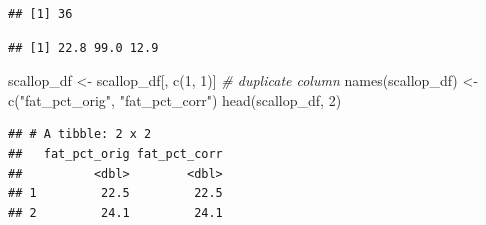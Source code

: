 \documentclass[
  11pt,
  a4paper,
]{book}
\newenvironment{Shaded}{\begin{snugshade}}{\end{snugshade}}
\newcommand{\CommentTok}[1]{\textcolor[rgb]{0.56,0.35,0.01}{\textit{#1}}}
\newcommand{\DecValTok}[1]{\textcolor[rgb]{0.00,0.00,0.81}{#1}}
\newcommand{\FloatTok}[1]{\textcolor[rgb]{0.00,0.00,0.81}{#1}}
\newcommand{\FunctionTok}[1]{\textcolor[rgb]{0.00,0.00,0.00}{#1}}
\newcommand{\NormalTok}[1]{#1}
\newcommand{\OtherTok}[1]{\textcolor[rgb]{0.56,0.35,0.01}{#1}}
\newcommand{\SpecialCharTok}[1]{\textcolor[rgb]{0.00,0.00,0.00}{#1}}
\newcommand{\StringTok}[1]{\textcolor[rgb]{0.31,0.60,0.02}{#1}}
\begin{document}
\begin{verbatim}
## [1] 36
\end{verbatim}

\begin{Shaded}
\end{Shaded}

\begin{verbatim}
## [1] 22.8 99.0 12.9
\end{verbatim}

\begin{Shaded}
\begin{Highlighting}[]
\NormalTok{scallop\_df }\OtherTok{\textless{}{-}}\NormalTok{ scallop\_df[, }\FunctionTok{c}\NormalTok{(}\DecValTok{1}\NormalTok{, }\DecValTok{1}\NormalTok{)] }\CommentTok{\# duplicate column}
\FunctionTok{names}\NormalTok{(scallop\_df) }\OtherTok{\textless{}{-}} \FunctionTok{c}\NormalTok{(}\StringTok{"fat\_pct\_orig"}\NormalTok{, }\StringTok{"fat\_pct\_corr"}\NormalTok{)}
\FunctionTok{head}\NormalTok{(scallop\_df, }\DecValTok{2}\NormalTok{)}
\end{Highlighting}
\end{Shaded}

\begin{verbatim}
## # A tibble: 2 x 2
##   fat_pct_orig fat_pct_corr
##          <dbl>        <dbl>
## 1         22.5         22.5
## 2         24.1         24.1
\end{verbatim}

\begin{Shaded}
\end{Shaded}
\end{document}
